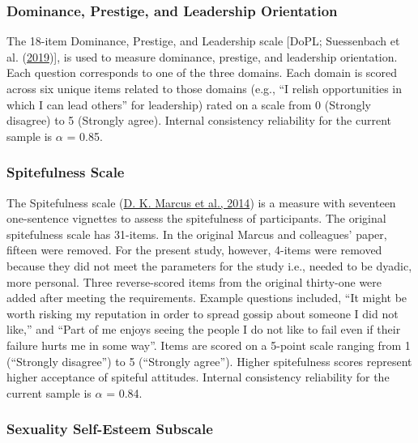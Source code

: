 \documentclass[
  donotrepeattitle,doc, 12pt, a4paper,floatsintext]{apa7}
\begin{document}
\hypertarget{dominance-prestige-and-leadership-orientation}{%
\subsubsection{Dominance, Prestige, and Leadership Orientation}\label{dominance-prestige-and-leadership-orientation}}

The 18-item Dominance, Prestige, and Leadership scale {[}DoPL; Suessenbach et al. (\protect\hyperlink{ref-suessenbach2019}{2019}){]}, is used to measure dominance, prestige, and leadership orientation. Each question corresponds to one of the three domains. Each domain is scored across six unique items related to those domains (e.g., ``I relish opportunities in which I can lead others'' for leadership) rated on a scale from 0 (Strongly disagree) to 5 (Strongly agree). Internal consistency reliability for the current sample is \(\alpha\) = 0.85.

\hypertarget{spitefulness-scale-1}{%
\subsubsection{Spitefulness Scale}\label{spitefulness-scale-1}}

The Spitefulness scale (\protect\hyperlink{ref-marcus2014}{D. K. Marcus et al., 2014}) is a measure with seventeen one-sentence vignettes to assess the spitefulness of participants. The original spitefulness scale has 31-items. In the original Marcus and colleagues' paper, fifteen were removed. For the present study, however, 4-items were removed because they did not meet the parameters for the study i.e., needed to be dyadic, more personal. Three reverse-scored items from the original thirty-one were added after meeting the requirements. Example questions included, ``It might be worth risking my reputation in order to spread gossip about someone I did not like,'' and ``Part of me enjoys seeing the people I do not like to fail even if their failure hurts me in some way''. Items are scored on a 5-point scale ranging from 1 (``Strongly disagree'') to 5 (``Strongly agree''). Higher spitefulness scores represent higher acceptance of spiteful attitudes. Internal consistency reliability for the current sample is \(\alpha\) = 0.84.

\hypertarget{sexuality-self-esteem-subscale-1}{%
\subsubsection{Sexuality Self-Esteem Subscale}\label{sexuality-self-esteem-subscale-1}}
\end{document}
